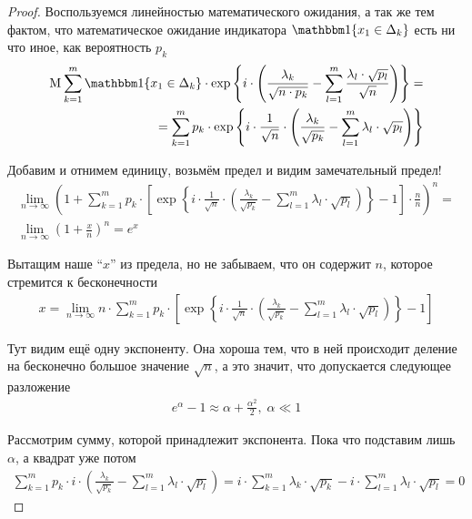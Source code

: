 \begin{proof}
  Воспользуемся линейностью математического ожидания, а так же тем фактом,
  что математическое ожидание индикатора $\Indicator{x_1 \in \Delta_k}$
  есть ни что иное, как вероятность $p_k$
  \begin{align*}
      \mean{\sum_{k=1}^{m} \Indicator{x_1 \in \Delta_k} \cdot
      \exp{\left\{ i \cdot \left( \frac{\lambda_k}{\sqrt{n \cdot p_k}}
          - \sum_{l=1}^{m} \frac{\lambda_l \cdot \sqrt{p_l}}{\sqrt{n}}
          \right) \right\}}} = \\
      = \sum_{k=1}^{m} p_k \cdot \exp{\left\{ i \cdot \frac{1}{\sqrt{n}}
           \cdot \left(\frac{\lambda_k}{\sqrt{p_k}}
        - \sum_{l=1}^{m}\lambda_l \cdot \sqrt{p_l} \right) \right\}}
  \end{align*}

  Добавим и отнимем единицу, возьмём предел и видим замечательный предел!
  \begin{align*}
      \lim_{n \to \infty} \left( 1 + \sum_{k=1}^{m} p_k \cdot \left[
      \exp{\left\{ i \cdot \frac{1}{\sqrt{n}}
           \cdot \left(\frac{\lambda_k}{\sqrt{p_k}}
        - \sum_{l=1}^{m}\lambda_l \cdot \sqrt{p_l} \right) \right\}}
      - 1 \right] \cdot \frac{n}{n} \right)^n = \\
      \lim_{n \to \infty} \left( 1 + \frac{x}{n} \right)^n = e^x
  \end{align*}

  Вытащим наше ``$x$'' из предела, но не забываем, что он содержит $n$,
  которое стремится к бесконечности
  \begin{align*}
      x = \lim_{n \to \infty} n \cdot \sum_{k=1}^{m} p_k \cdot \left[
      \exp{\left\{ i \cdot \frac{1}{\sqrt{n}}
           \cdot \left(\frac{\lambda_k}{\sqrt{p_k}}
        - \sum_{l=1}^{m}\lambda_l \cdot \sqrt{p_l} \right) \right\}}
      - 1 \right]
  \end{align*}

  Тут видим ещё одну экспоненту. Она хороша тем, что в ней происходит деление
  на бесконечно большое значение $\sqrt{n}$, а это значит, что допускается
  следующее разложение
  \begin{align*}
      e^{\alpha} - 1 \approx \alpha + \frac{\alpha^2}{2},\; \alpha \ll 1
  \end{align*}

  Рассмотрим сумму, которой принадлежит экспонента. Пока что подставим лишь
  $\alpha$, а квадрат уже потом
  \begin{align*}
      \sum_{k=1}^{m} p_k \cdot i
       \cdot \left(\frac{\lambda_k}{\sqrt{p_k}}
          - \sum_{l=1}^{m}\lambda_l \cdot \sqrt{p_l} \right)
      = i \cdot \sum_{k=1}^{m} \lambda_k \cdot \sqrt{p_k}
      - i \cdot \sum_{l=1}^{m} \lambda_l \cdot \sqrt{p_l}
      = 0
  \end{align*}


\end{proof}
